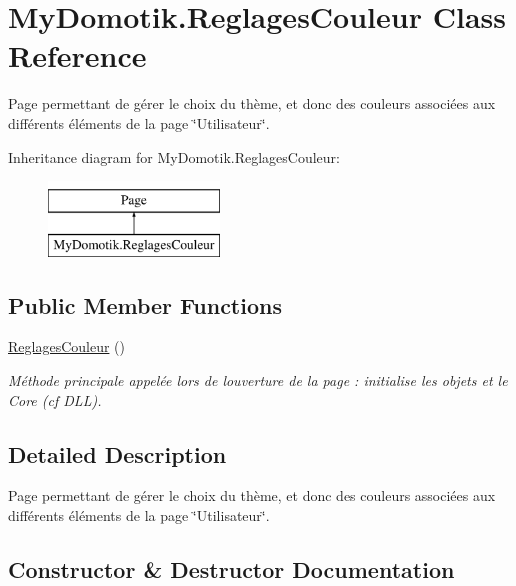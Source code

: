 \hypertarget{class_my_domotik_1_1_reglages_couleur}{}\section{My\+Domotik.\+Reglages\+Couleur Class Reference}
\label{class_my_domotik_1_1_reglages_couleur}


Page permettant de gérer le choix du thème, et donc des couleurs associées aux différents éléments de la page \char`\"{}\+Utilisateur\char`\"{}.  


Inheritance diagram for My\+Domotik.\+Reglages\+Couleur\+:\begin{figure}[H]
\begin{center}
\leavevmode
\includegraphics[height=2.000000cm]{class_my_domotik_1_1_reglages_couleur}
\end{center}
\end{figure}
\subsection*{Public Member Functions}
\begin{DoxyCompactItemize}
\item 
\hyperlink{class_my_domotik_1_1_reglages_couleur_a4fedb870b805c881363f4e06c0926b38}{Reglages\+Couleur} ()
\begin{DoxyCompactList}\small\item\em Méthode principale appelée lors de l\textquotesingle{}ouverture de la page \+: initialise les objets et le Core (cf D\+LL). \end{DoxyCompactList}\end{DoxyCompactItemize}


\subsection{Detailed Description}
Page permettant de gérer le choix du thème, et donc des couleurs associées aux différents éléments de la page \char`\"{}\+Utilisateur\char`\"{}. 



\subsection{Constructor \& Destructor Documentation}
